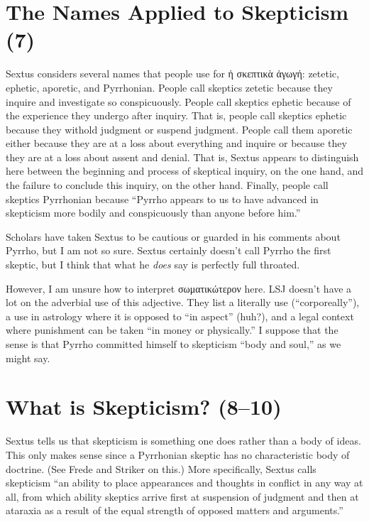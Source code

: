 \section*{The Names Applied to Skepticism (7)}


Sextus considers several names that people use for \textgreek{ἡ σκεπτικὰ ἀγωγή}: zetetic, ephetic, aporetic, and Pyrrhonian. People call skeptics zetetic because they inquire and investigate so conspicuously. People call skeptics ephetic because of the experience they undergo after inquiry. That is, people call skeptics ephetic because they withold judgment or suspend judgment. People call them aporetic either because they are at a loss about everything and inquire or because they they are at a loss about assent and denial. That is, Sextus appears to distinguish here between the beginning and process of skeptical inquiry, on the one hand, and the failure to conclude this inquiry, on the other hand. Finally, people call skeptics Pyrrhonian because ``Pyrrho appears to us to have advanced in skepticism more bodily and conspicuously than anyone before him.''

Scholars have taken Sextus to be cautious or guarded in his comments about Pyrrho, but I am not so sure. Sextus certainly doesn't call Pyrrho the first skeptic, but I think that what he \textit{does} say is perfectly full throated.

However, I am unsure how to interpret \textgreek{σωματικώτερον} here. LSJ doesn't have a lot on the adverbial use of this adjective. They list a literally use (``corporeally''), a use in astrology where it is opposed to ``in aspect'' (huh?), and a legal context where punishment can be taken ``in money or physically.'' I suppose that the sense is that Pyrrho committed himself to skepticism ``body and soul,'' as we might say.

\section*{What is Skepticism? (8--10)}

Sextus tells us that skepticism is something one does rather than a body of ideas. This only makes sense since a Pyrrhonian skeptic has no characteristic body of doctrine. (See Frede and Striker on this.) More specifically, Sextus calls skepticism ``an ability to place appearances and thoughts in conflict in any way at all, from which ability skeptics arrive first at suspension of judgment and then at ataraxia as a result of the equal strength of opposed matters and arguments.''

